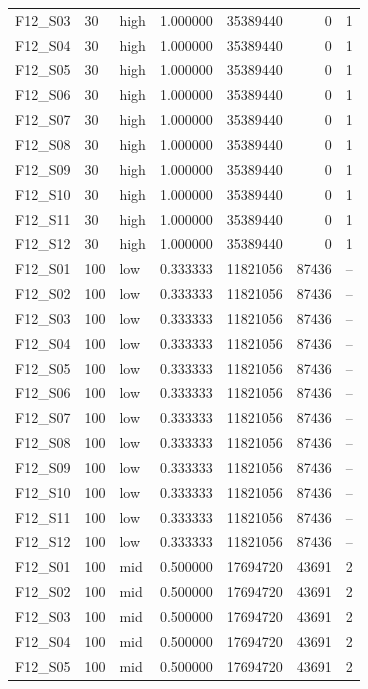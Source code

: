 \begin{longtable}{lllr r r r}
F12\_S03 & 30 & high & 1.000000 & 35389440 & 0 & 1 \\
F12\_S04 & 30 & high & 1.000000 & 35389440 & 0 & 1 \\
F12\_S05 & 30 & high & 1.000000 & 35389440 & 0 & 1 \\
F12\_S06 & 30 & high & 1.000000 & 35389440 & 0 & 1 \\
F12\_S07 & 30 & high & 1.000000 & 35389440 & 0 & 1 \\
F12\_S08 & 30 & high & 1.000000 & 35389440 & 0 & 1 \\
F12\_S09 & 30 & high & 1.000000 & 35389440 & 0 & 1 \\
F12\_S10 & 30 & high & 1.000000 & 35389440 & 0 & 1 \\
F12\_S11 & 30 & high & 1.000000 & 35389440 & 0 & 1 \\
F12\_S12 & 30 & high & 1.000000 & 35389440 & 0 & 1 \\
F12\_S01 & 100 & low & 0.333333 & 11821056 & 87436 & -- \\
F12\_S02 & 100 & low & 0.333333 & 11821056 & 87436 & -- \\
F12\_S03 & 100 & low & 0.333333 & 11821056 & 87436 & -- \\
F12\_S04 & 100 & low & 0.333333 & 11821056 & 87436 & -- \\
F12\_S05 & 100 & low & 0.333333 & 11821056 & 87436 & -- \\
F12\_S06 & 100 & low & 0.333333 & 11821056 & 87436 & -- \\
F12\_S07 & 100 & low & 0.333333 & 11821056 & 87436 & -- \\
F12\_S08 & 100 & low & 0.333333 & 11821056 & 87436 & -- \\
F12\_S09 & 100 & low & 0.333333 & 11821056 & 87436 & -- \\
F12\_S10 & 100 & low & 0.333333 & 11821056 & 87436 & -- \\
F12\_S11 & 100 & low & 0.333333 & 11821056 & 87436 & -- \\
F12\_S12 & 100 & low & 0.333333 & 11821056 & 87436 & -- \\
F12\_S01 & 100 & mid & 0.500000 & 17694720 & 43691 & 2 \\
F12\_S02 & 100 & mid & 0.500000 & 17694720 & 43691 & 2 \\
F12\_S03 & 100 & mid & 0.500000 & 17694720 & 43691 & 2 \\
F12\_S04 & 100 & mid & 0.500000 & 17694720 & 43691 & 2 \\
F12\_S05 & 100 & mid & 0.500000 & 17694720 & 43691 & 2 \\

\end{longtable}
